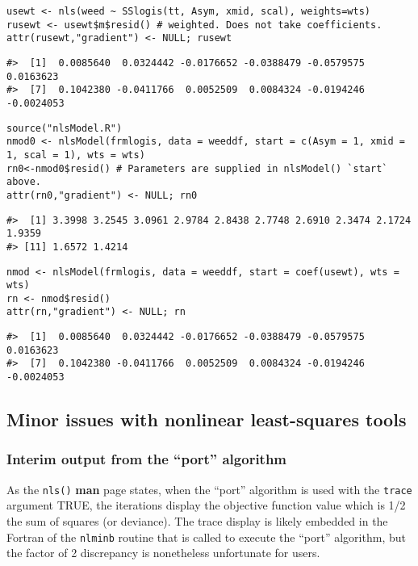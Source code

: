 \begin{verbatim}
usewt <- nls(weed ~ SSlogis(tt, Asym, xmid, scal), weights=wts)
rusewt <- usewt$m$resid() # weighted. Does not take coefficients.
attr(rusewt,"gradient") <- NULL; rusewt
\end{verbatim}

\begin{verbatim}
#>  [1]  0.0085640  0.0324442 -0.0176652 -0.0388479 -0.0579575  0.0163623
#>  [7]  0.1042380 -0.0411766  0.0052509  0.0084324 -0.0194246 -0.0024053
\end{verbatim}

\begin{verbatim}
source("nlsModel.R")
nmod0 <- nlsModel(frmlogis, data = weeddf, start = c(Asym = 1, xmid = 1, scal = 1), wts = wts)
rn0<-nmod0$resid() # Parameters are supplied in nlsModel() `start` above.
attr(rn0,"gradient") <- NULL; rn0
\end{verbatim}

\begin{verbatim}
#>  [1] 3.3998 3.2545 3.0961 2.9784 2.8438 2.7748 2.6910 2.3474 2.1724 1.9359
#> [11] 1.6572 1.4214
\end{verbatim}

\begin{verbatim}
nmod <- nlsModel(frmlogis, data = weeddf, start = coef(usewt), wts = wts)
rn <- nmod$resid()
attr(rn,"gradient") <- NULL; rn
\end{verbatim}

\begin{verbatim}
#>  [1]  0.0085640  0.0324442 -0.0176652 -0.0388479 -0.0579575  0.0163623
#>  [7]  0.1042380 -0.0411766  0.0052509  0.0084324 -0.0194246 -0.0024053
\end{verbatim}

\hypertarget{minor-issues-with-nonlinear-least-squares-tools}{%
\subsection{Minor issues with nonlinear least-squares tools}\label{minor-issues-with-nonlinear-least-squares-tools}}

\hypertarget{interim-output-from-the-port-algorithm}{%
\subsubsection{Interim output from the ``port'' algorithm}\label{interim-output-from-the-port-algorithm}}

As the \texttt{nls()} \textbf{man} page states, when the ``port'' algorithm is used with the
\texttt{trace} argument TRUE, the iterations display the objective function value which
is 1/2 the sum of squares (or deviance). The trace display is likely
embedded in the Fortran of the \texttt{nlminb} routine that is called to execute
the ``port'' algorithm, but the factor of 2 discrepancy is nonetheless
unfortunate for users.

